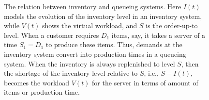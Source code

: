 \begin{figure}[th]
\begin{center}
\end{center}
\caption{The relation between inventory and queueing systems. Here $I(t)$ models the evolution of the inventory level in an inventory system, while $V(t)$ shows the virtual workload, and $S$ is the order-up-to level. When a customer requires $D_1$ items, say, it takes a server of a time $S_1=D_1$ to produce these items. Thus, demands at the inventory system convert into production times in a queueing system. When the inventory is always replenished to level $S$, then the shortage of the inventory level relative to $S$, i.e., $S-I(t)$, becomes the workload $V(t)$ for the server in terms of amount of items or production time.} \label{fig:inv_queue}
\end{figure}




